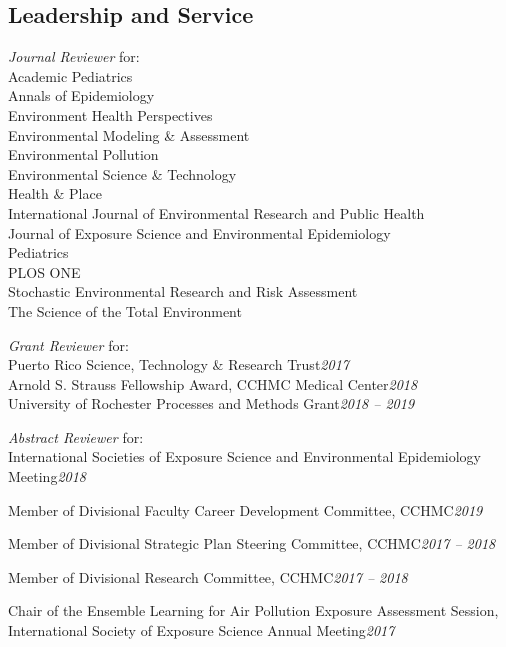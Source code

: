 \documentclass[margin,line]{res}
\newenvironment{list3}{
  \begin{list}{}{%
      \setlength{\itemsep}{0in}
      \setlength{\parsep}{0in} \setlength{\parskip}{0in}
      \setlength{\topsep}{0in} \setlength{\partopsep}{0in}
      \setlength{\leftmargin}{0in}}}{\end{list}}
\begin{document}
\begin{resume}
\section{\sc Leadership and Service}
\begin{list3} \itemsep 4pt
\item[] \textit{Journal Reviewer} for: \\
        Academic Pediatrics \\
        Annals of Epidemiology \\
        Environment Health Perspectives \\
        Environmental Modeling \& Assessment \\
        Environmental Pollution \\
        Environmental Science \& Technology \\
        Health \& Place \\
        International Journal of Environmental Research and Public Health \\
        Journal of Exposure Science and Environmental Epidemiology \\
        Pediatrics \\
        PLOS ONE \\
        Stochastic Environmental Research and Risk Assessment \\
        The Science of the Total Environment
\item[] \textit{Grant Reviewer} for: \\
        Puerto Rico Science, Technology \& Research Trust\hfill \textit{2017}\\
        Arnold S. Strauss Fellowship Award, CCHMC
        Medical Center\hfill \textit{2018}\\
        University of Rochester Processes and
        Methods Grant\hfill \textit{2018 -- 2019}
\item[] \textit{Abstract Reviewer} for: \\
        International Societies of Exposure Science and Environmental Epidemiology Meeting\hfill \textit{2018}
\item[] Member of Divisional Faculty Career Development Committee, CCHMC\hfill \textit{2019}
\item[] Member of Divisional Strategic Plan Steering Committee, CCHMC\hfill \textit{2017 -- 2018}
\item[] Member of Divisional Research Committee, CCHMC\hfill \textit{2017 -- 2018}
\item[] Chair of the Ensemble Learning for Air Pollution Exposure Assessment Session, \\International Society of Exposure Science Annual Meeting\hfill \textit{2017}

\end{list3}
\end{resume}
\end{document}
